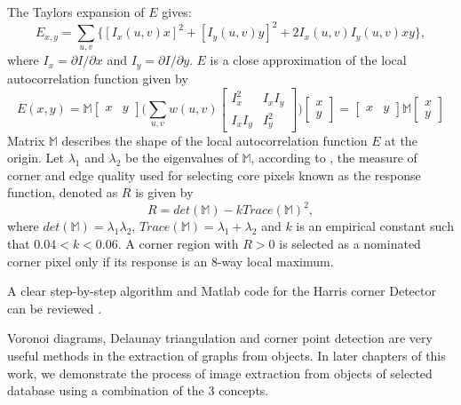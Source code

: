 \documentclass[10pt,a4paper]{article}
\theoremstyle{plain}
\theoremstyle{definition}
\begin{document}
      The Taylors expansion of $E$ gives:
      \begin{equation}
      E_{x,y} = \sum_{u,v} \{[I_x (u,v)x]^2 + [I_y(u,v)y]^2 + 2I_x(u,v)I_y (u,v)xy\},
      \end{equation}  
      where $I_x = \partial I / \partial x$ and $I_y = \partial I /\partial y$. $E$ is a close approximation of the local autocorrelation function given by
      \begin{equation}
      E(x,y) = \mathbb{M}\begin{bmatrix}
      x & y
      \end{bmatrix} \Bigg(\sum_{u,v} w(u,v)  
       \begin{bmatrix}
       I_x ^2 & I_x I_y  \\
       I_xI_y & I_y ^2
       \end{bmatrix}  \Bigg)\begin{bmatrix}
      x \\
      y
      \end{bmatrix}  = \begin{bmatrix}
      x & y
      \end{bmatrix} \mathbb{M}\begin{bmatrix}
      x \\
      y
      \end{bmatrix}
      \end{equation}
      Matrix $\mathbb{M}$ describes the shape of the local autocorrelation function $E$ at the origin.
      Let $\lambda_1$ and $\lambda_2$ be the eigenvalues of $\mathbb{M}$, according to \citep{harris1988combined}, the measure of corner and edge quality used for selecting core pixels known as the response function, denoted as $R$ is given by
      \begin{equation}
      R = det(\mathbb{M}) - kTrace(\mathbb{M})^2,
      \end{equation}       
      where $det(\mathbb{M})=\lambda_1 \lambda_2$, $Trace(\mathbb{M}) = \lambda_1+ \lambda_2$ and $k$ is an empirical constant such that $0.04 <k < 0.06$.
      A corner region with $R>0$ is selected as a nominated corner pixel only if its response is an $8$-way local maximum.
      
      A clear step-by-step algorithm and Matlab code for the Harris corner Detector can be reviewed \citep{stoica2011delaunay}.
      
     Voronoi diagrams, Delaunay triangulation and corner point detection are very useful methods in the extraction of graphs from objects. In later chapters of this work, we demonstrate the process of image extraction from objects of selected database using a combination of the $3$ concepts.
     
\end{document}
